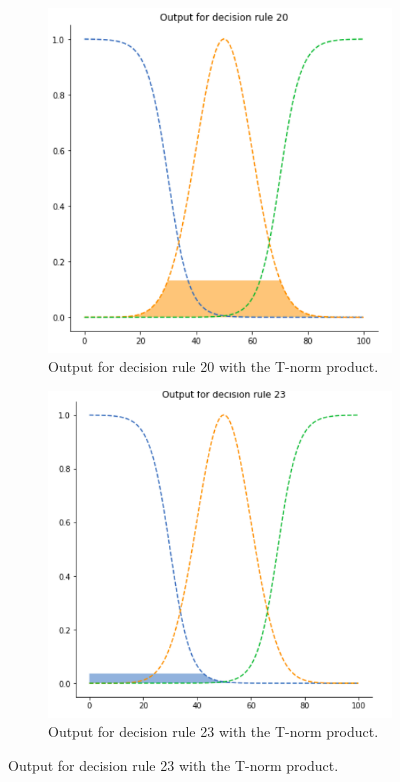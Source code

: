 \begin{figure}[ht]
\begin{subfigure}{.5\textwidth}
  \centering
  \includegraphics[width=.8\linewidth]{figures/third/prod1.png}  
  \caption{Output for decision rule 20 with the T-norm product.}
  \label{fig:3prod1}
\end{subfigure}
\begin{subfigure}{.5\textwidth}
  \centering
  \includegraphics[width=.8\linewidth]{figures/third/prod2.png}  
  \caption{Output for decision rule 23 with the T-norm product.}
  \label{fig:3prod2}
\end{subfigure}

\end{figure}

